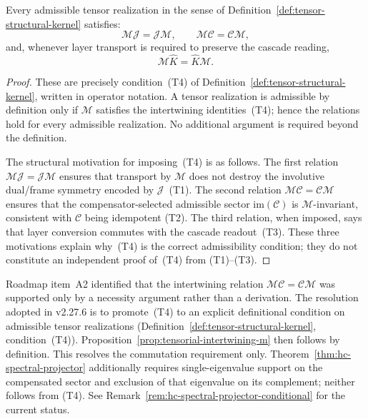 \begin{proposition}
\label{prop:tensorial-intertwining-m}
Every admissible tensor realization in the sense of
Definition~\ref{def:tensor-structural-kernel} satisfies:
\[
\mathcal M\mathcal J=\mathcal J\mathcal M,
\qquad
\mathcal M\mathcal C=\mathcal C\mathcal M,
\]
and, whenever layer transport is required to preserve the cascade reading,
\[
\mathcal M\hat K=\hat K\mathcal M.
\]
\end{proposition}

\begin{proof}
These are precisely condition~(T4) of
Definition~\ref{def:tensor-structural-kernel}, written in operator
notation. A tensor realization is admissible by definition only if
$\mathcal M$ satisfies the intertwining identities~(T4); hence the
relations hold for every admissible realization. No additional argument
is required beyond the definition.

The structural motivation for imposing~(T4) is as follows. The first
relation $\mathcal M\mathcal J=\mathcal J\mathcal M$ ensures that
transport by $\mathcal M$ does not destroy the involutive dual/frame
symmetry encoded by $\mathcal J$~(T1). The second relation
$\mathcal M\mathcal C=\mathcal C\mathcal M$ ensures that the
compensator-selected admissible sector $\mathrm{im}(\mathcal C)$ is
$\mathcal M$-invariant, consistent with $\mathcal C$ being idempotent
(T2). The third relation, when imposed, says that layer conversion
commutes with the cascade readout~(T3). These three motivations
explain why~(T4) is the correct admissibility condition; they do not
constitute an independent proof of~(T4) from (T1)--(T3).
\end{proof}

\begin{remark}
\label{rem:a2-resolved}
Roadmap item~A2 identified that the intertwining relation
$\mathcal M\mathcal C=\mathcal C\mathcal M$ was supported only by a
necessity argument rather than a derivation. The resolution adopted
in v2.27.6 is to promote~(T4) to an explicit definitional condition
on admissible tensor realizations
(Definition~\ref{def:tensor-structural-kernel}, condition~(T4)).
Proposition~\ref{prop:tensorial-intertwining-m} then follows by
definition. This resolves the commutation requirement only.
Theorem~\ref{thm:hc-spectral-projector} additionally requires
single-eigenvalue support on the compensated sector and exclusion of
that eigenvalue on its complement; neither follows from (T4).
See Remark~\ref{rem:hc-spectral-projector-conditional} for the current status.
\end{remark}

